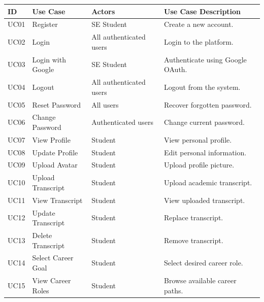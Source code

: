 \begin{longtable}{|>{\centering\arraybackslash}p{1cm}|p{4cm}|p{3.3cm}|p{7.2cm}|}
\hline
\rowcolor[HTML]{F4D7D7}
\textbf{ID} &
\textbf{Use Case} &
\textbf{Actors} &
\textbf{Use Case Description}
\\
\hline
\endfirsthead

\hline
\endhead

UC01 &
Register &
SE Student &
Create a new account.
\\
\hline

UC02 &
Login &
All authenticated users &
Login to the platform.
\\
\hline

UC03 &
Login with Google &
SE Student &
Authenticate using Google OAuth.
\\
\hline

UC04 &
Logout &
All authenticated users &
Logout from the system.
\\
\hline

UC05 &
Reset Password &
All users &
Recover forgotten password.
\\
\hline

UC06 &
Change Password &
Authenticated users &
Change current password.
\\
\hline

UC07 &
View Profile &
Student &
View personal profile.
\\
\hline

UC08 &
Update Profile &
Student &
Edit personal information.
\\
\hline

UC09 &
Upload Avatar &
Student &
Upload profile picture.
\\
\hline

UC10 &
Upload Transcript &
Student &
Upload academic transcript.
\\
\hline

UC11 &
View Transcript &
Student &
View uploaded transcript.
\\
\hline

UC12 &
Update Transcript &
Student &
Replace transcript.
\\
\hline

UC13 &
Delete Transcript &
Student &
Remove transcript.
\\
\hline

UC14 &
Select Career Goal &
Student &
Select desired career role.
\\
\hline

UC15 &
View Career Roles &
Student &
Browse available career paths.
\\
\hline


\end{longtable}

